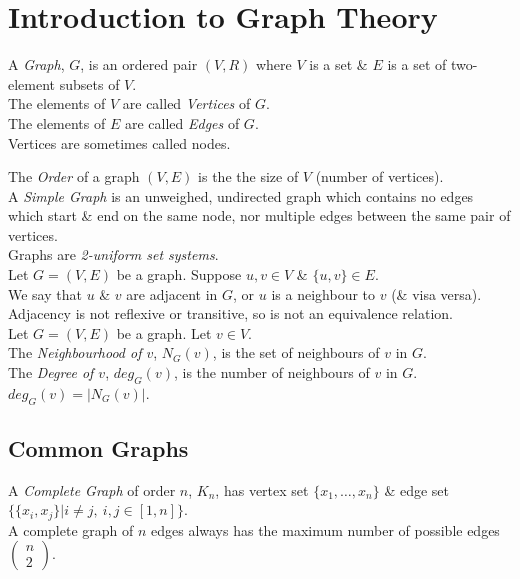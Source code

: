 \documentclass[11pt,a4paper]{article}
\begin{document}
\section{Introduction to Graph Theory}

A \textit{Graph}, $G$, is an ordered pair $(V,R)$ where $V$ is a set \& $E$ is a set of two-element subsets of $V$.\\
The elements of $V$ are called \textit{Vertices} of $G$.\\
The elements of $E$ are called \textit{Edges} of $G$.\\
\nb Vertices are sometimes called nodes.\

The \textit{Order} of a graph $(V,E)$ is the the size of $V$ (number of vertices).\\

A \textit{Simple Graph} is an unweighed, undirected graph which contains no edges which start \& end on the same node, nor multiple edges between the same pair of vertices.\\

Graphs are \textit{2-uniform set systems}.\\

Let $G=(V,E)$ be a graph. Suppose $u,v\in V$ \& $\{u,v\}\in E$.\\
We say that $u$ \& $v$ are adjacent in $G$, or $u$ is a neighbour to $v$ (\& visa versa).\\
\nb Adjacency is not reflexive or transitive, so is not an equivalence relation.\\

Let $G=(V,E)$ be a graph. Let $v\in V$.\\
The \textit{Neighbourhood of $v$}, $N_G(v)$, is the set of neighbours of $v$ in $G$.\\
The \textit{Degree of $v$}, $deg_G(v)$,  is the number of neighbours of $v$ in $G$.\\
\nb $deg_G(v)=|N_G(v)|$.\\

\subsection{Common Graphs}

A \textit{Complete Graph} of order $n$, $K_n$, has vertex set $\{x_1,\dots,x_n\}$ \& edge set $\{\{x_i,x_j\}|i\neq j,\ i,j\in[1,n]\}$.\\
A complete graph of $n$ edges always has the maximum number of possible edges $\begin{pmatrix}n\\2\end{pmatrix}$.\\
\end{document}
